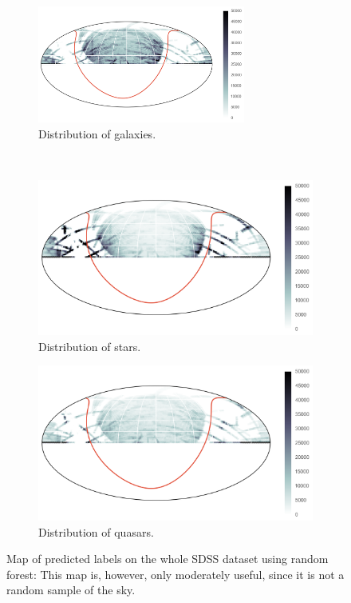 \begin{figure}[p]
	\centering
	\begin{subfigure}{\textwidth}
		\centering
		\includegraphics[width=0.75\textwidth]{figures/4_expt1/map_prediction_forest_galaxies}
		\caption{Distribution of galaxies.}
		\label{fig:random1}
	\end{subfigure}\\
	\begin{subfigure}{\textwidth}
		\centering
		\includegraphics[width=0.75\linewidth]{figures/4_expt1/map_prediction_forest_stars}
		\caption{Distribution of stars.}
		\label{fig:random2}
	\end{subfigure}
	\begin{subfigure}{\textwidth}
		\centering
		\includegraphics[width=0.75\linewidth]{figures/4_expt1/map_prediction_forest_quasars}
		\caption{Distribution of quasars.}
		\label{fig:random3}
	\end{subfigure}
	\caption[Map of predicted labels on all SDSS data.]{
		Map of predicted labels on the whole SDSS dataset using random forest: This
		map is, however, only moderately useful, since it is not a random sample of the sky.}
	\label{fig:forest}
\end{figure}


